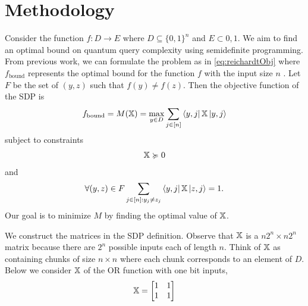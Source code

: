 \section{Methodology}\label{sec:method}

Consider the function $f: D \rightarrow E$ where $D
\subseteq {\{0,1\}}^n$ and $E \subset {0,1}$. We aim to find an
optimal bound on quantum query complexity using semidefinite
programming. From previous work,
we can formulate the problem as in \cref{eq:reichardtObj} where
$f_{\text{bound}}$ represents the optimal bound for the function
$f$ with the input size $n$ \cite{reichardt2009span}.
Let $F$ be the set of $(y,z)$ such that $f(y) \neq f(z)$.
Then the objective function of the SDP is
\begin{align} \label{eq:reichardtObj}
    f_{\text{bound}} = M(\operatorname{\mathbb{X}}) = \max_{y \in D} \sum_{j \in [n]}
    \bra{y,j}\operatorname{\mathbb{X}}\ket{y,j} 
\end{align}
subject to constraints
\begin{align}\label{Eq:semi1}
    \operatorname{\mathbb{X}} \succcurlyeq 0 
\end{align}
and
\begin{align}\label{Eq:off-diag}
    \forall (y,z) \in F \sum_{j \in [n]: y_j \ne z_j} 
    \bra{y,j} \operatorname{\mathbb{X}} \ket{z, j} = 1.
\end{align}
Our goal is to minimize $M$ by finding the optimal value of $\operatorname{\mathbb{X}}$.

We construct the matrices in the SDP definition.
Observe that $\operatorname{\mathbb{X}}$ is a $n2^n \times n2^n$ matrix 
because there are $2^n$ possible inputs each of length $n$. 
Think of $\operatorname{\mathbb{X}}$ as containing chunks of size 
$n \times n$ where each chunk corresponds to an element of $D$. %
Below we consider $\operatorname{\mathbb{X}}$ of the OR function with one bit inputs,
\begin{align}
    \operatorname{\mathbb{X}} = \left[
    \begin{matrix}
        1 & 1 \\
        1 & 1
    \end{matrix}
    \right]
    \nonumber
\end{align}

